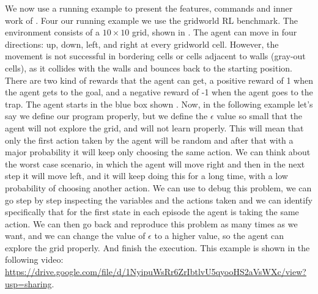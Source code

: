 We now use a running example to present the features, commands and inner work of \flik. Four 
our running example we use the gridworld \ac{RL} benchmark. The environment consists of a 
$10 \times 10$ grid, shown in . The agent can move in four directions: up, down, 
left, and right at every gridworld cell. However, the movement is not successful in bordering cells 
or cells adjacent to walls (\ie gray-out cells), as it collides with the walls and bounces back to the 
starting position.
There are two kind of rewards that the agent can get, a positive reward of 1 when 
the agent gets to the goal, and a negative reward of -1 when the agent goes to the 
trap. The agent starts in the blue box shown . Now, in the following
example let's say we define our program properly, but we define the $\epsilon$ value 
so small that the agent will not explore the grid, and will not learn properly. 
This will mean that only the first action taken by the agent will be random and after that
with a major probability it will keep only choosing the same action. We can think about 
the worst case scenario, in which the agent will move right and then in the next step it 
will move left, and it will keep doing this for a long time, with a low probability of 
choosing another action. We can use \flik to debug this problem, we can go step by step
inspecting the variables and the actions taken and we can identify specifically that for 
the first state in each episode the agent is taking the same action. We can then go back and
reproduce this problem as many times as we want, and we can change the value of $\epsilon$
to a higher value, so the agent can explore the grid properly. And finish the execution.
This example is shown in the following video: \url{https://drive.google.com/file/d/1NyipuWsRr6ZrIbtlvU5qyooHS2aVsWXc/view?usp=sharing}.



\endinput

